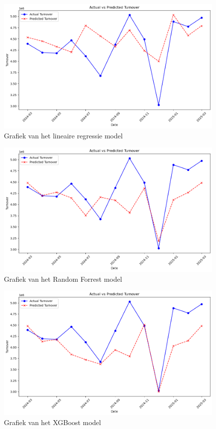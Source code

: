 \begin{figure}[H]
    \centering
    \includegraphics[width=1\linewidth]{images/Linear_Grafiek}
    \caption{Grafiek van het lineaire regressie model}
    \label{fig:GrafiekLinear}
\end{figure}

\begin{figure}[H]
    \centering
    \includegraphics[width=1\linewidth]{images/RandomForrest_Grafiek}
    \caption{Grafiek van het Random Forrest model}
    \label{fig:GrafiekForrest}
\end{figure}

\begin{figure}[H]
    \centering
    \includegraphics[width=1\linewidth]{images/XGBoost_Grafiek}
    \caption{Grafiek van het XGBoost model}
    \label{fig:GrafiekXGBoost}
\end{figure}

